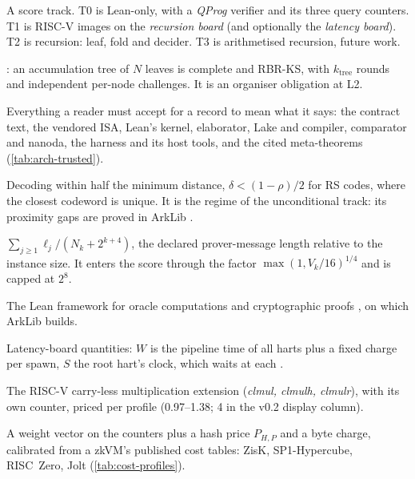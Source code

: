 \begin{description}[leftmargin=0pt,itemsep=2pt,parsep=0pt,font=\normalfont\bfseries]
\item[Track (T0--T3).] A score track. T0 is Lean-only, with a \emph{QProg} verifier and its three
  query counters. T1 is RISC-V images on the \emph{recursion board} (and optionally the
  \emph{latency board}). T2 is recursion: leaf, fold and decider. T3 is arithmetised recursion,
  future work.

\item[Tree composition theorem.] : an accumulation tree of $N$ leaves is complete
  and RBR-KS, with $k_{\mathrm{tree}}$ rounds and independent per-node challenges. It is an
  organiser obligation at L2.

\item[Trusted surface.] Everything a reader must accept for a record to mean what it says: the
  contract text, the vendored ISA, Lean's kernel, elaborator, Lake and compiler, comparator and
  nanoda, the harness and its host tools, and the cited meta-theorems (\cref{tab:arch-trusted}).

\item[Unique decoding.] Decoding within half the minimum distance, $\delta<(1-\rho)/2$ for RS
  codes, where the closest codeword is unique. It is the regime of the unconditional track: its
  proximity gaps are proved in ArkLib \cite{BCIKS20}.

\item[$V_k$ (blow-up).] $\sum_{j\ge1}\ell_j/(N_k+2^{k+4})$, the declared prover-message length
  relative to the instance size. It enters the score through the factor $\max(1,V_k/16)^{1/4}$ and
  is capped at $2^8$.

\item[VCVio.] The Lean framework for oracle computations and cryptographic proofs
  \cite{tuma2026vcvio}, on which ArkLib builds.

\item[W, S (work, span).] Latency-board quantities: $W$ is the pipeline time of all harts plus a
  fixed charge per spawn, $S$ the root hart's clock, which waits at each .

\item[Zbc.] The RISC-V carry-less multiplication extension (\emph{clmul, clmulh, clmulr}), with its
  own counter, priced per profile (0.97--1.38; 4 in the v0.2 display column).

\item[zkVM profile.] A weight vector on the counters plus a hash price $P_{H,P}$ and a byte charge,
  calibrated from a zkVM's published cost tables: ZisK, SP1-Hypercube, RISC~Zero, Jolt
  (\cref{tab:cost-profiles}).

\end{description}
\endgroup
